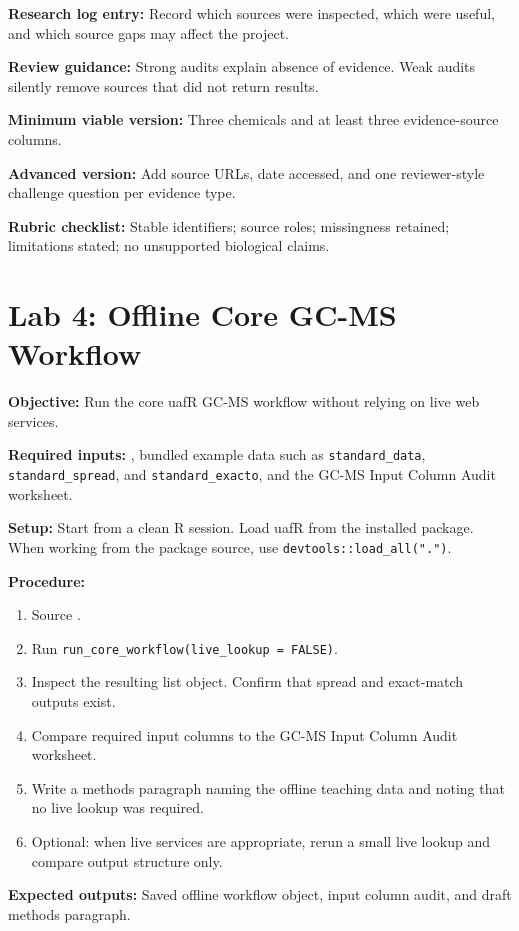 \textbf{Research log entry:} Record which sources were inspected, which were useful, and which source gaps may affect the project.

\textbf{Review guidance:} Strong audits explain absence of evidence. Weak audits silently remove sources that did not return results.

\textbf{Minimum viable version:} Three chemicals and at least three evidence-source columns.

\textbf{Advanced version:} Add source URLs, date accessed, and one reviewer-style challenge question per evidence type.

\textbf{Rubric checklist:} Stable identifiers; source roles; missingness retained; limitations stated; no unsupported biological claims.

\section{Lab 4: Offline Core GC-MS Workflow}
\textbf{Objective:} Run the core uafR GC-MS workflow without relying on live web services.

\textbf{Required inputs:} , bundled example data such as \texttt{standard\_data}, \texttt{standard\_spread}, and \texttt{standard\_exacto}, and the GC-MS Input Column Audit worksheet.

\textbf{Setup:} Start from a clean R session. Load uafR from the installed package. When working from the package source, use \texttt{devtools::load\_all(".")}.

\textbf{Procedure:}
\begin{enumerate}
  \item Source .
  \item Run \texttt{run\_core\_workflow(live\_lookup = FALSE)}.
  \item Inspect the resulting list object. Confirm that spread and exact-match outputs exist.
  \item Compare required input columns to the GC-MS Input Column Audit worksheet.
  \item Write a methods paragraph naming the offline teaching data and noting that no live lookup was required.
  \item Optional: when live services are appropriate, rerun a small live lookup and compare output structure only.
\end{enumerate}

\textbf{Expected outputs:} Saved offline workflow object, input column audit, and draft methods paragraph.

